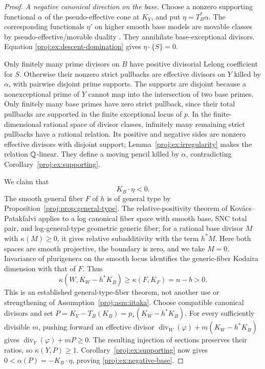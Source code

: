\begin{proof}
\smallskip
\noindent\emph{A negative canonical direction on the base.}
Choose a nonzero supporting functional \(\alpha\) of the
pseudo-effective cone at \(K_Y\), and put
\(\eta=T_B^*\alpha\). The corresponding functionals \(\eta'\)
on higher smooth base models are movable classes by
pseudo-effective/movable duality \cite[Theorem~0.2]{BDPP}.
They annihilate base-exceptional divisors. Equation
\eqref{proj:ex:descent-domination} gives \(\eta\cdot\{S\}=0\).

Only finitely many prime divisors on \(B\) have positive
divisorial Lelong coefficient for \(S\). Otherwise their
nonzero strict pullbacks are effective divisors on \(Y\)
killed by \(\alpha\), with pairwise disjoint prime supports.
The supports are disjoint because a nonexceptional prime of
\(Y\) cannot map into the intersection of two base primes.
Only finitely many base primes have zero strict pullback,
since their total pullbacks are supported in the finite
exceptional locus of \(p\). In the finite-dimensional rational
space of divisor classes, infinitely many remaining strict
pullbacks have a rational relation. Its positive and negative
sides are nonzero effective divisors with disjoint support;
Lemma~\ref{proj:ex:irregularity} makes the relation
\(\mathbb{Q}\)-linear. They define a moving pencil killed by
\(\alpha\), contradicting Corollary~\ref{proj:ex:supporting}.

We claim that
\begin{equation}\label{proj:ex:negative-base}
 K_B\cdot\eta<0.
\end{equation}
The smooth general fiber \(F\) of \(h\) is of general type by
Proposition~\ref{proj:prop:general-type}. The relative-positivity
theorem of Kov\'acs--Patakfalvi
\cite[Theorem~9.9]{Proj-KovacsPatakfalvi2017} applies to a log
canonical fiber space with smooth base, SNC total pair, and
log-general-type geometric generic fiber; for a rational base
divisor \(M\) with \(\kappa(M)\geq0\), it gives relative
subadditivity with the term \(h^*M\). Here both spaces are
smooth projective, the boundary is zero, and we take \(M=0\).
Invariance of plurigenera on the smooth locus identifies the
generic-fiber Kodaira dimension with that of \(F\). Thus
\begin{equation}\label{proj:ex:relative-positive}
 \kappa(W,K_W-h^*K_B)\geq \kappa(F,K_F)=n-b>0.
\end{equation}
This is an established general-type-fiber theorem, not another
use or strengthening of Assumption~\ref{proj:asm:iitaka}.
Choose compatible canonical divisors and set
\(P=K_Y-T_B(K_B)=p_*(K_W-h^*K_B)\).
For every sufficiently divisible \(m\), pushing forward an
effective divisor
\(\operatorname{div}_W(\varphi)+m(K_W-h^*K_B)\)
gives
\(\operatorname{div}_Y(\varphi)+mP\geq0\).
The resulting injection of sections preserves their ratios,
so \(\kappa(Y,P)\geq1\). Corollary~\ref{proj:ex:supporting} now gives
\(0<\alpha(P)=-K_B\cdot\eta\), proving
\eqref{proj:ex:negative-base}.


\end{proof}
